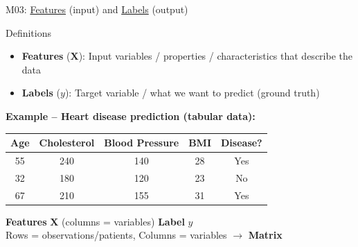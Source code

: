 \documentclass[aspectratio=169, 10pt]{beamer}
\begin{document}
\begin{frame}{M03: \href{https://en.wikipedia.org/wiki/Feature_(machine_learning)}{Features} (input) and \href{https://en.wikipedia.org/wiki/Labeled_data}{Labels} (output)}

    \begin{block}{\footnotesize Definitions}
        \footnotesize
        \begin{itemize}
            \item \textbf{Features} ($\mathbf{X}$): Input variables / properties / characteristics that describe the data
            \item \textbf{Labels} ($y$): Target variable / what we want to predict (ground truth)
        \end{itemize}
    \end{block}

    \vspace{2mm}
    \textbf{Example -- Heart disease prediction (tabular data):}

    \begin{table}
        \centering
        \footnotesize
        \begin{tabular}{cccc|c}
            \toprule
            \textbf{Age} & \textbf{Cholesterol} & \textbf{Blood Pressure} & \textbf{BMI} & \textbf{Disease?} \\
            \midrule
            55 & 240 & 140 & 28 & Yes \\
            32 & 180 & 120 & 23 & No \\
            67 & 210 & 155 & 31 & Yes \\
            \bottomrule
        \end{tabular}
    \end{table}

    \begin{center}
        \footnotesize
        \textcolor{uibblue}{\textbf{Features} $\mathbf{X}$ (columns = variables)} \hspace{1cm} \textcolor{uibred}{\textbf{Label} $y$}\\
        Rows = observations/patients, Columns = variables $\rightarrow$ \textbf{Matrix}
    \end{center}

\end{frame}
\end{document}

